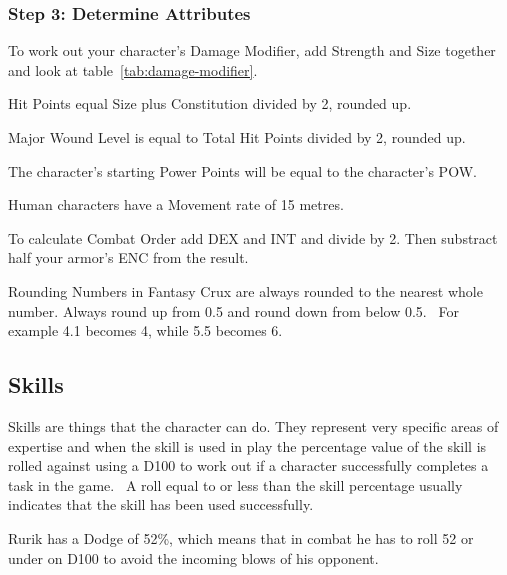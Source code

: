 \subsubsection{Step 3: Determine Attributes}
To work out your character’s Damage Modifier, add Strength and Size together and look at table~\ref{tab:damage-modifier}.

Hit Points equal Size plus Constitution divided by 2, rounded up. 

Major Wound Level is equal to Total Hit Points divided by 2, rounded up.

The character’s starting Power Points will be equal to the character’s POW.

Human characters have a Movement rate of 15 metres.

To calculate Combat Order add DEX and INT and divide by 2. Then substract half your armor's ENC from the result.

\vspace{3mm}
\begin{rpg-titlebox}{Rounding}
	Numbers in Fantasy Crux are always rounded to the nearest whole number. Always round up from 0.5 and round down from below 0.5.  For example 4.1 becomes 4, while 5.5 becomes 6.
\end{rpg-titlebox}

\subsection{Skills}
Skills are things that the character can do. They represent very specific areas of expertise and when the skill is used in play the percentage value of the skill is rolled against using a D100 to work out if a character successfully completes a task in the game.  A roll equal to or less than the skill percentage usually indicates that the skill has been used successfully.

\begin{rpg-examplebox}
	Rurik has a Dodge of 52\%, which means that in combat he has to roll 52 or under on D100 to avoid the incoming blows of his opponent.
\end{rpg-examplebox}

